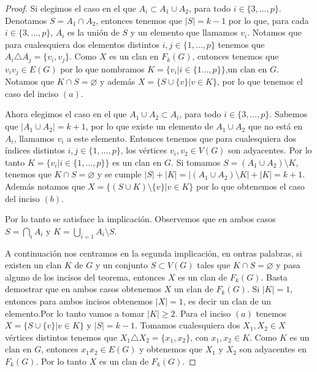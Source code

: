 \begin{proof}
        Si elegimos el caso en el que $A_i \subset A_1\cup A_2$, para todo $i\in
        \{3, \dots, p\}$. Denotamos $S= A_1 \cap A_2$, entonces tenemos que $|S|
        =k-1$ por lo que, para cada $i \in \{3, \dots, p\}$, $A_i$ es la uni\'on
        de $S$ y un elemento que llamamos $v_i$. Notamos que para cualesquiera
        dos elementos distintos $i, j \in \{1, \dots, p\}$ tenemos que $A_i
        \triangle A_j = \{v_i, v_j\}$. Como $X$ es un clan en $F_k(G)$, entonces
        tenemos que $v_i{v_j} \in E(G)$ por lo que nombramos $K= \{v_i|i \in \{1
        \dots, p\}\}$,un clan en $G$. Notamos que  $K \cap S = \varnothing$ y
        adem\'as $X= \{S \cup \{v\}| v \in K\}$, por lo que tenemos el caso del
        inciso $(a)$. 

        Ahora elegimos el caso en el que $A_1\cup A_2 \subset A_i$, para todo
        $i\in \{3, \dots, p\}$. Sabemos que $|A_1 \cup A_2| = k+1$, por lo que
        existe un elemento de $A_1 \cup A_2$ que no est\'a en $A_i$, llamamos
        $v_i$ a este elemento. Entonces tenemos que para cualesquiera dos
        \'indices distintos $i, j \in \{1, \dots, p\}$, los v\'ertices $v_i, v_2
        \in V(G)$ son adyacentes. Por lo tanto $K= \{v_i| i \in \{1, \dots,
        p\}\}$ es un clan en $G$. Si tomamos $S= (A_1 \cup A_2)\setminus K$,
        tenemos que $K \cap S = \varnothing$ y se cumple $|S| + |K|= |(A_1 \cup
        A_2)\setminus K| + |K| = k+1$. Adem\'as notamos que $X = \{(S \cup
        K)\setminus \{v\}|v\in K\}$ por lo que obtenemos el caso del inciso
        $(b)$.

        Por lo tanto se satisface la implicaci\'on. Observemos que en ambos
        casos $S = \bigcap\limits_{i} A_i$ y $K = \bigcup\limits_{i=1} A_i
        \setminus S$.
        
        A continuaci\'on nos centramos en la segunda implicaci\'on, en ontras
        palabras, si existen un clan $K$ de $G$ y un conjunto $S \subset V(G)$
        tales que $K \cap S = \varnothing$ y pasa alguno de los incisos del
        teorema, entonces $X$ es un clan de $F_k(G)$. Basta demostrar que en
        ambos casos obtenemos $X$ un clan de $F_k(G)$. Si $|K| =1$, entonces
        para ambos incisos obtenemos $|X| =1$, es decir un clan de un
        elemento.Por lo tanto vamos a tomar $|K| \geq 2$. Para el inciso $(a)$
        tenemos $X = \{S \cup \{v\}| v \in K\}$ y $|S| = k-1$. Tomamos
        cualesquiera dos $X_1, X_2 \in X$ v\'ertices distintos tenemos que $X_1
        \triangle X_2 =\{x_1, x_2\}$, con $x_1, x_2 \in K$. Como $K$ es un clan
        en $G$, entonces $x_1x_2 \in E(G)$ y obtenemos que $X_1$ y $X_2$ son
        adyacentes en $F_k(G)$. Por lo tanto $X$ es un clan de $F_k(G)$.


\end{proof}
